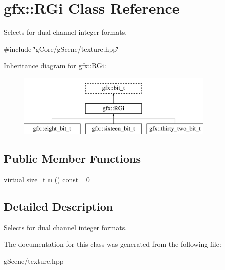 \hypertarget{classgfx_1_1RGi}{\section{gfx\-:\-:R\-Gi Class Reference}
\label{classgfx_1_1RGi}
}


Selects for dual channel integer formats.  




{\ttfamily \#include \char`\"{}g\-Core/g\-Scene/texture.\-hpp\char`\"{}}

Inheritance diagram for gfx\-:\-:R\-Gi\-:\begin{figure}[H]
\begin{center}
\leavevmode
\includegraphics[height=3.000000cm]{classgfx_1_1RGi}
\end{center}
\end{figure}
\subsection*{Public Member Functions}
\begin{DoxyCompactItemize}
\item 
\hypertarget{classgfx_1_1RGi_ab0e559f567589dd6516d13930f7d172f}{virtual size\-\_\-t {\bfseries n} () const =0}\label{classgfx_1_1RGi_ab0e559f567589dd6516d13930f7d172f}

\end{DoxyCompactItemize}


\subsection{Detailed Description}
Selects for dual channel integer formats. 

The documentation for this class was generated from the following file\-:\begin{DoxyCompactItemize}
\item 
g\-Scene/texture.\-hpp\end{DoxyCompactItemize}
